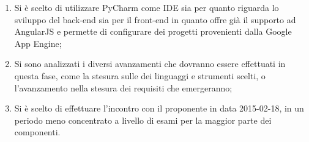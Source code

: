 \begin{enumerate}
		\item Si è scelto di utilizzare PyCharm come IDE sia per quanto riguarda lo sviluppo del back-end sia per il front-end in quanto offre già il supporto ad AngularJS e permette di configurare dei progetti provenienti dalla Google App Engine;
		\item Si sono analizzati i diversi avanzamenti che dovranno essere effettuati in questa fase, come la stesura sulle \docNameVersionNdP{} dei linguaggi e strumenti scelti, o l'avanzamento nella stesura dei requisiti che emergeranno;
		\item Si è scelto di effettuare l'incontro con il proponente in data 2015-02-18, in un periodo meno concentrato a livello di esami per la maggior parte dei componenti.
	\end{enumerate}
